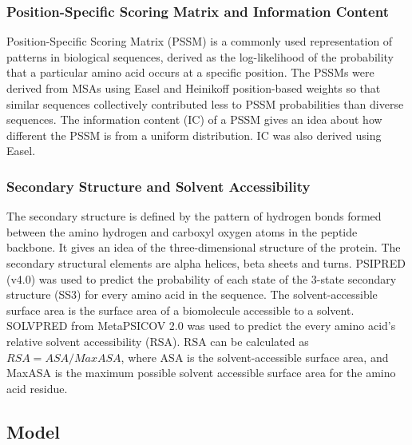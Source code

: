 \documentclass[journal=jcisd8,manuscript=article]{achemso}
\begin{document}
\subsubsection{Position-Specific Scoring Matrix and Information Content}
\quad Position-Specific Scoring Matrix (PSSM) is a commonly used representation of patterns in biological sequences, derived as the log-likelihood of the probability that a particular amino acid occurs at a specific position. The PSSMs were derived from MSAs using Easel\cite{potter2018hmmer} and Heinikoff position-based weights so that similar sequences collectively contributed less to PSSM probabilities than diverse sequences. The information content (IC) of a PSSM gives an idea about how different the PSSM is from a uniform distribution. IC was also derived using Easel.

\subsubsection{Secondary Structure and Solvent Accessibility}
\quad The secondary structure is defined by the pattern of hydrogen bonds formed between the amino hydrogen and carboxyl oxygen atoms in the peptide backbone. It gives an idea of the three-dimensional structure of the protein. The secondary structural elements are alpha helices, beta sheets and turns. PSIPRED (v4.0)\cite{jones1999protein} was used to predict the probability of each state of the 3-state secondary structure (SS3) for every amino acid in the sequence. The solvent-accessible surface area is the surface area of a biomolecule accessible to a solvent. SOLVPRED from MetaPSICOV 2.0\cite{jones2015metapsicov} was used to predict the every amino acid's relative solvent accessibility (RSA). RSA can be calculated as \\ ${RSA} = {ASA} / {MaxASA}$, where ASA is the solvent-accessible surface area, and MaxASA is the maximum possible solvent accessible surface area for the amino acid residue.

\subsection{Model}
\end{document}
